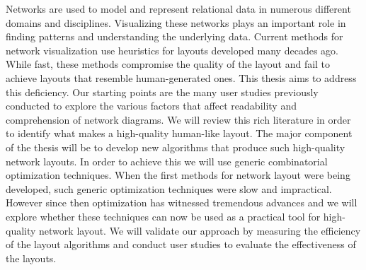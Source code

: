 \documentclass[a4paper,11pt,phdthesis,singlespace,twoside]{cssethesis}
\begin{document}
\begin{thesisabstract}

Networks are used to model and represent relational data in numerous different domains and disciplines. Visualizing these networks plays an important role in finding patterns and understanding the underlying data. Current methods for network visualization use heuristics for layouts developed many decades ago. While fast, these methods compromise the quality of the layout and fail to achieve layouts that resemble human-generated ones. This thesis aims to address this deficiency. Our starting points are the many user studies previously conducted to explore the various factors that affect readability and comprehension of network diagrams. We will review this rich literature in order to identify what makes a high-quality human-like layout. The major component of the thesis will be to develop new algorithms that produce such high-quality network layouts. In order to achieve this we will use generic combinatorial optimization techniques. When the first methods for network layout were being developed, such generic optimization techniques were slow and impractical. However since then optimization has witnessed tremendous advances and we will explore whether these techniques can now be used as a practical tool for high-quality network layout.  We will validate our approach by measuring the efficiency of the layout algorithms and conduct user studies to evaluate the effectiveness of the layouts.
\end{thesisabstract}                 


\end{document}
